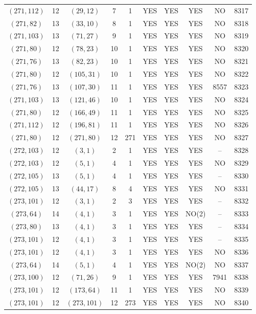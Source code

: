 \begin{longtable}{|c|c|c|c|c|c|c|c|c|c|}
$(271, 112)$ & 12 & $(29, 12)$ & 7 & 1 & YES & YES & YES & NO & 8317\\
$(271, 82)$ & 13 & $(33, 10)$ & 8 & 1 & YES & YES & YES & NO & 8318\\
$(271, 103)$ & 13 & $(71, 27)$ & 9 & 1 & YES & YES & YES & NO & 8319\\
$(271, 80)$ & 12 & $(78, 23)$ & 10 & 1 & YES & YES & YES & NO & 8320\\
$(271, 76)$ & 13 & $(82, 23)$ & 10 & 1 & YES & YES & YES & NO & 8321\\
$(271, 80)$ & 12 & $(105, 31)$ & 10 & 1 & YES & YES & YES & NO & 8322\\
$(271, 76)$ & 13 & $(107, 30)$ & 11 & 1 & YES & YES & YES & 8557 & 8323\\
$(271, 103)$ & 13 & $(121, 46)$ & 10 & 1 & YES & YES & YES & NO & 8324\\
$(271, 80)$ & 12 & $(166, 49)$ & 11 & 1 & YES & YES & YES & NO & 8325\\
$(271, 112)$ & 12 & $(196, 81)$ & 11 & 1 & YES & YES & YES & NO & 8326\\
$(271, 80)$ & 12 & $(271, 80)$ & 12 & 271 & YES & YES & YES & NO & 8327\\
$(272, 103)$ & 12 & $(3, 1)$ & 2 & 1 & YES & YES & YES & -- & 8328\\
$(272, 103)$ & 12 & $(5, 1)$ & 4 & 1 & YES & YES & YES & NO & 8329\\
$(272, 105)$ & 13 & $(5, 1)$ & 4 & 1 & YES & YES & YES & -- & 8330\\
$(272, 105)$ & 13 & $(44, 17)$ & 8 & 4 & YES & YES & YES & NO & 8331\\
$(273, 101)$ & 12 & $(3, 1)$ & 2 & 3 & YES & YES & YES & -- & 8332\\
$(273, 64)$ & 14 & $(4, 1)$ & 3 & 1 & YES & YES & NO(2) & -- & 8333\\
$(273, 80)$ & 13 & $(4, 1)$ & 3 & 1 & YES & YES & YES & -- & 8334\\
$(273, 101)$ & 12 & $(4, 1)$ & 3 & 1 & YES & YES & YES & -- & 8335\\
$(273, 101)$ & 12 & $(4, 1)$ & 3 & 1 & YES & YES & YES & NO & 8336\\
$(273, 64)$ & 14 & $(5, 1)$ & 4 & 1 & YES & YES & NO(2) & NO & 8337\\
$(273, 100)$ & 12 & $(71, 26)$ & 9 & 1 & YES & YES & YES & 7941 & 8338\\
$(273, 101)$ & 12 & $(173, 64)$ & 11 & 1 & YES & YES & YES & NO & 8339\\
$(273, 101)$ & 12 & $(273, 101)$ & 12 & 273 & YES & YES & YES & NO & 8340\\

\end{longtable}
